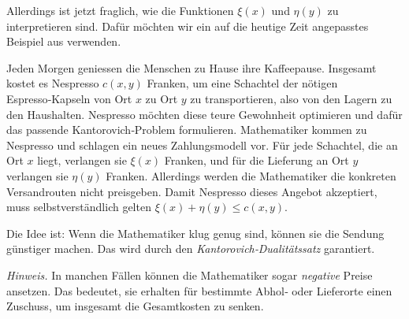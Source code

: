 Allerdings ist jetzt fraglich,
wie die Funktionen $\xi(x)$ und $\eta(y)$ zu interpretieren sind.
Dafür möchten wir ein
auf die heutige Zeit angepasstes Beispiel aus \cite{mongekant:villani} verwenden.

Jeden Morgen geniessen die Menschen zu Hause ihre Kaffeepause.
Insgesamt kostet es Nespresso $c(x,y)$ Franken,
um eine Schachtel der nötigen Espresso‑Kapseln von Ort $x$ zu Ort $y$ zu transportieren,
also von den Lagern zu den Haushalten.
Nespresso möchten diese teure Gewohnheit optimieren und
dafür das passende Kantorovich‑Problem formulieren.
Mathematiker kommen zu Nespresso und schlagen ein neues Zahlungsmodell vor.
Für jede Schachtel,
die an Ort $x$ liegt,
verlangen sie $\xi(x)$ Franken,
und für die Lieferung an Ort $y$ verlangen sie $\eta(y)$ Franken.
Allerdings werden die Mathematiker die konkreten
Versandrouten nicht preisgeben.
Damit Nespresso dieses Angebot akzeptiert,
muss selbstverständlich gelten $\xi(x)+\eta(y) \leq c(x,y)$.


Die Idee ist:
Wenn die Mathematiker klug genug sind,
können sie die Sendung günstiger machen.
Das wird durch den \emph{Kantorovich‑Dualitätssatz} garantiert.

\noindent
\emph{Hinweis.}
In manchen Fällen können die Mathematiker sogar \emph{negative} Preise ansetzen.
Das bedeutet,
sie erhalten für bestimmte Abhol‑ oder Lieferorte einen Zuschuss,
um insgesamt die Gesamtkosten zu senken.
